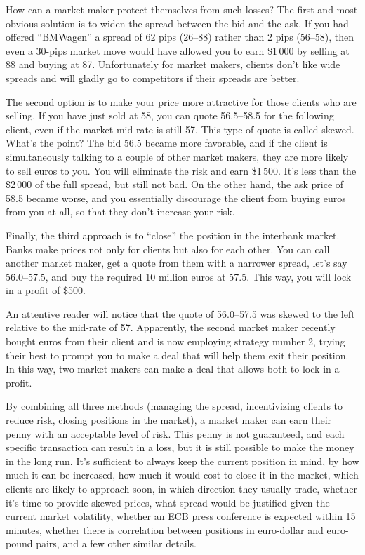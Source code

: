 \documentclass[a4paper,14pt]{extarticle}
\begin{document}
How can a market maker protect themselves from such losses? The first and most 
obvious solution is to widen the spread between the bid and the ask. If you had 
offered ``BMWagen'' a spread of 62 pips (26--88) rather than 2 pips (56--58),
then even a 30-pips market move would have allowed you to earn \$1\,000 by 
selling at 88 and buying at 87. Unfortunately for market makers, clients don't 
like wide spreads and will gladly go to competitors if their spreads are better.

The second option is to make your price more attractive for those clients who 
are selling. If you have just sold at 58, you can quote 56.5--58.5 for the 
following client, even if the market mid-rate is still 57. This type of quote is 
called skewed. What's the point? The bid 56.5 became more favorable, and if the 
client is simultaneously talking to a couple of other market makers, they are 
more likely to sell euros to you. You will eliminate the risk and earn \$1\,500. 
It's less than the \$2\,000 of the full spread, but still not bad. On the other 
hand, the ask price of 58.5 became worse, and you essentially discourage the 
client from buying euros from you at all, so that they don't increase your risk.

Finally, the third approach is to ``close'' the position in the interbank 
market. Banks make prices not only for clients but also for each other. You can 
call another market maker, get a quote from them with a narrower spread, let's 
say 56.0--57.5, and buy the required 10 million euros at 57.5. This way, you 
will lock in a profit of \$500.

An attentive reader will notice that the quote of 56.0--57.5 was skewed to the 
left relative to the mid-rate of 57. Apparently, the second market maker 
recently bought euros from their client and is now employing strategy number 2, 
trying their best to prompt you to make a deal that will help them exit their 
position. In this way, two market makers can make a deal that allows both to 
lock in a profit.

By combining all three methods (managing the spread, incentivizing clients to 
reduce risk, closing positions in the market), a market maker can earn their 
penny with an acceptable level of risk. This penny is not guaranteed, and each 
specific transaction can result in a loss, but it is still possible to make the 
money in the long run. It's sufficient to always keep the current position in 
mind, by how much it can be increased, how much it would cost to close it in the 
market, which clients are likely to approach soon, in which direction they 
usually trade, whether it's time to provide skewed prices, what spread would be 
justified given the current market volatility, whether an ECB press conference 
is expected within 15 minutes, whether there is correlation between positions in 
euro-dollar and euro-pound pairs, and a few other similar details.
\end{document}
